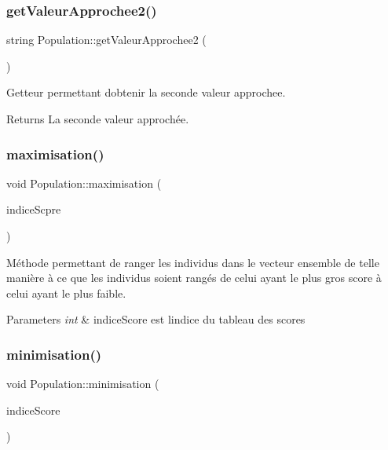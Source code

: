 \subsubsection{\texorpdfstring{get\+Valeur\+Approchee2()}{getValeurApprochee2()}}
{\footnotesize\ttfamily string Population\+::get\+Valeur\+Approchee2 (\begin{DoxyParamCaption}\item[{void}]{ }\end{DoxyParamCaption})}



Getteur permettant d\textquotesingle{}obtenir la seconde valeur approchee. 

\begin{DoxyReturn}{Returns}
La seconde valeur approchée. 
\end{DoxyReturn}
\mbox{\label{class_population_ae240b80ad4eae0f1b2ec5ec1edcd88c3}} 
\subsubsection{\texorpdfstring{maximisation()}{maximisation()}}
{\footnotesize\ttfamily void Population\+::maximisation (\begin{DoxyParamCaption}\item[{int}]{indice\+Scpre }\end{DoxyParamCaption})}



Méthode permettant de ranger les individus dans le vecteur ensemble de telle manière à ce que les individus soient rangés de celui ayant le plus gros score à celui ayant le plus faible. 


\begin{DoxyParams}{Parameters}
{\em int} & indice\+Score est l\textquotesingle{}indice du tableau des scores \\
\hline
\end{DoxyParams}
\mbox{\label{class_population_a6f27e76b6b15668b343c43c56027515d}} 
\subsubsection{\texorpdfstring{minimisation()}{minimisation()}}
{\footnotesize\ttfamily void Population\+::minimisation (\begin{DoxyParamCaption}\item[{int}]{indice\+Score }\end{DoxyParamCaption})}



